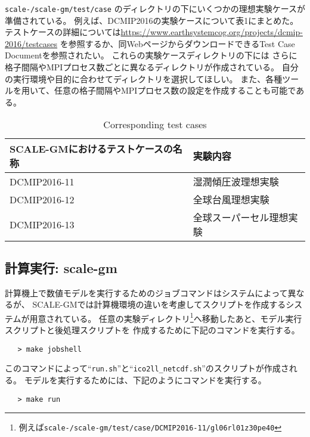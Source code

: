 \noindent \texttt{scale-{\version}/scale-gm/test/case} のディレクトリの下にいくつかの理想実験ケースが準備されている。
例えば、DCMIP2016の実験ケースについて表1にまとめた。
テストケースの詳細については\url{https://www.earthsystemcog.org/projects/dcmip-2016/testcases}
を参照するか、同WebページからダウンロードできるTest Case Documentを参照されたい。
これらの実験ケースディレクトリの下には
さらに格子間隔やMPIプロセス数ごとに異なるディレクトリが作成されている。
自分の実行環境や目的に合わせてディレクトリを選択してほしい。
また、各種ツールを用いて、任意の格子間隔やMPIプロセス数の設定を作成することも可能である。
 \begin{table}[h]
 \begin{center}
 \caption{Corresponding test cases}
 \begin{tabularx}{150mm}{|l|X|} \hline
 \rowcolor[gray]{0.9} SCALE-GMにおけるテストケースの名称 & 実験内容 \\ \hline
  DCMIP2016-11 & 湿潤傾圧波理想実験  \\ \hline
  DCMIP2016-12 & 全球台風理想実験 \\ \hline
  DCMIP2016-13 & 全球スーパーセル理想実験 \\ \hline
 \end{tabularx}
 \end{center}
 \end{table}


\subsection{計算実行: scale-gm}

計算機上で数値モデルを実行するためのジョブコマンドはシステムによって異なるが、
SCALE-GMでは計算機環境の違いを考慮してスクリプトを作成するシステムが用意されている。
任意の実験ディレクトリ\footnote{例えば\texttt{scale-{\version}/scale-gm/test/case/DCMIP2016-11/gl06rl01z30pe40}}へ移動したあと、モデル実行スクリプトと後処理スクリプトを
作成するために下記のコマンドを実行する。

 \begin{verbatim}
   > make jobshell
 \end{verbatim}

このコマンドによって``\verb|run.sh|''と``\verb|ico2ll_netcdf.sh|''のスクリプトが作成される。
モデルを実行するためには、下記のようにコマンドを実行する。

 \begin{verbatim}
   > make run
 \end{verbatim}

